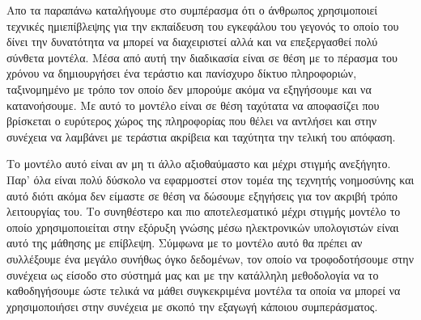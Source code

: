 \par
Απο τα παραπάνω καταλήγουμε στο συμπέρασμα ότι ο άνθρωπος χρησιμοποιεί τεχνικές ημιεπίβλεψης για την εκπαίδευση του εγκεφάλου του γεγονός το οποίο του δίνει την δυνατότητα να μπορεί να διαχειριστεί αλλά και να επεξεργασθεί πολύ σύνθετα μοντέλα. Μέσα από αυτή την διαδικασία είναι σε θέση με το πέρασμα του χρόνου να δημιουργήσει ένα τεράστιο και πανίσχυρο δίκτυο πληροφοριών, ταξινομημένο με τρόπο τον οποίο δεν μπορούμε ακόμα να εξηγήσουμε και να κατανοήσουμε. Με αυτό το μοντέλο είναι σε θέση ταχύτατα να αποφασίζει που βρίσκεται ο ευρύτερος χώρος της πληροφορίας που θέλει να αντλήσει και στην συνέχεια να λαμβάνει με τεράστια ακρίβεια και ταχύτητα την τελική του απόφαση.   
\par
Το μοντέλο αυτό είναι αν μη τι άλλο αξιοθαύμαστο και μέχρι στιγμής ανεξήγητο. Παρ' όλα είναι πολύ δύσκολο να εφαρμοστεί στον τομέα της τεχνητής νοημοσύνης και αυτό διότι ακόμα δεν είμαστε σε θέση να δώσουμε εξηγήσεις για τον ακριβή τρόπο λειτουργίας του. Το συνηθέστερο και πιο αποτελεσματικό μέχρι στιγμής μοντέλο το οποίο χρησιμοποιείται στην εξόρυξη γνώσης μέσω ηλεκτρονικών υπολογιστών είναι αυτό της μάθησης με επίβλεψη. Σύμφωνα με το μοντέλο αυτό θα πρέπει αν συλλέξουμε ένα μεγάλο συνήθως όγκο δεδομένων, τον οποίο να τροφοδοτήσουμε στην συνέχεια ως είσοδο στο σύστημά μας και με την κατάλληλη μεθοδολογία να το καθοδηγήσουμε ώστε τελικά να μάθει συγκεκριμένα μοντέλα τα οποία να μπορεί να χρησιμοποιήσει στην συνέχεια με σκοπό την εξαγωγή κάποιου συμπεράσματος.

